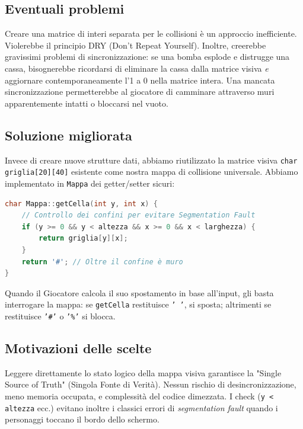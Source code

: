 \documentclass[12pt,a4paper]{article}
\begin{document}
\subsection{Eventuali problemi}
Creare una matrice di interi separata per le collisioni è un approccio inefficiente. Violerebbe il principio DRY (Don't Repeat Yourself). Inoltre, creerebbe gravissimi problemi di sincronizzazione: se una bomba esplode e distrugge una cassa, bisognerebbe ricordarsi di eliminare la cassa dalla matrice visiva \textit{e} aggiornare contemporaneamente l'1 a 0 nella matrice intera. Una mancata sincronizzazione permetterebbe al giocatore di camminare attraverso muri apparentemente intatti o bloccarsi nel vuoto.

\subsection{Soluzione migliorata}
Invece di creare nuove strutture dati, abbiamo riutilizzato la matrice visiva \texttt{char griglia[20][40]} esistente come nostra mappa di collisione universale. Abbiamo implementato in \texttt{Mappa} dei getter/setter sicuri:

\begin{lstlisting}[language=C++]
char Mappa::getCella(int y, int x) {
    // Controllo dei confini per evitare Segmentation Fault
    if (y >= 0 && y < altezza && x >= 0 && x < larghezza) {
        return griglia[y][x];
    }
    return '#'; // Oltre il confine è muro
}
\end{lstlisting}

Quando il Giocatore calcola il suo spostamento in base all'input, gli basta interrogare la mappa: se \texttt{getCella} restituisce \texttt{' '}, si sposta; altrimenti se restituisce \texttt{'\#'} o \texttt{'\%'} si blocca.

\subsection{Motivazioni delle scelte}
Leggere direttamente lo stato logico della mappa visiva garantisce la "Single Source of Truth" (Singola Fonte di Verità). Nessun rischio di desincronizzazione, meno memoria occupata, e complessità del codice dimezzata. I check (\texttt{y < altezza} ecc.) evitano inoltre i classici errori di \textit{segmentation fault} quando i personaggi toccano il bordo dello schermo.
\end{document}
